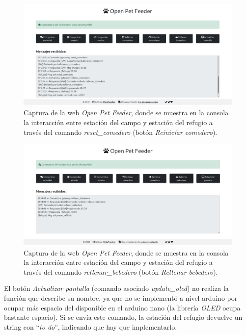 \documentclass[12pt]{article}
\begin{document}
	\begin{figure}[h!]
		\begin{center}
			\includegraphics[width=1\textwidth]{img_comp/captura_web_6.png}
			\caption{Captura de la web \textit{Open Pet Feeder}, donde se muestra en la consola la interacción entre estación del campo y estación del refugio a través del comando \textit{reset\_comedero} (botón \textit{Reiniciar comedero}).}
			\label{captura web 6}
		\end{center}
	\end{figure}

	\pagebreak
	
	\begin{figure}[h!]
		\begin{center}
			\includegraphics[width=1\textwidth]{img_comp/captura_web_7.png}
			\caption{Captura de la web \textit{Open Pet Feeder}, donde se muestra en la consola la interacción entre estación del campo y estación del refugio a través del comando \textit{rellenar\_bebedero} (botón \textit{Rellenar bebedero}).}
			\label{captura web 7}
		\end{center}
	\end{figure}
	
	\noindent El botón \textit{Actualizar pantalla} (comando asociado \textit{update\_oled}) no realiza la función que describe su nombre, ya que no se implementó a nivel arduino por ocupar más espacio del disponible en el arduino nano (la librería \textit{OLED} ocupa bastante espacio). Si se envía este comando, la estación del refugio devuelve un string con ``\textit{to do}'', indicando que hay que implementarlo.\\
	
\end{document}
